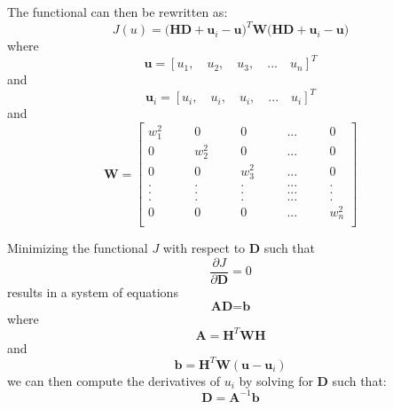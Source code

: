\documentclass[12pt]{extarticle}
\begin{document}
The functional can then be rewritten as:
\begin{equation}
    J(u) = \Big(\textbf{H} \textbf{D} + \textbf{u}_{i} - \textbf{u} \Big)^{T} \textbf{W} \Big(\textbf{H} \textbf{D} + \textbf{u}_{i} - \textbf{u} \Big)
\end{equation}
where
\begin{equation}
    \textbf{u} = \left[ u_{1}, \quad u_{2}, \quad u_{3}, \quad ... \quad u_{n} \right]^{T}
\end{equation}
and
\begin{equation}
    \textbf{u}_{i} = \left[ u_{i}, \quad u_{i}, \quad u_{i}, \quad ... \quad u_{i} \right]^{T}
\end{equation}
and
\begin{equation*}
\textbf{W}= 
  \begin{bmatrix}
      w_{1}^{2} & \quad  & 0 & \quad  & 0 & \quad & ... & \quad & 0 \\
      0 & \quad  & w_{2}^{2} & \quad  & 0 & \quad & ... & \quad & 0 \\
      0 & \quad  & 0 & \quad  & w_{3}^{2} & \quad & ... & \quad & 0 \\
    . & \quad  & . & \quad  & . & \quad & ... & \quad & . \\
    . & \quad  & . & \quad  & . & \quad & ... & \quad & . \\
    . & \quad  & . & \quad  & . & \quad & ... & \quad & . \\
      0 & \quad  & 0 & \quad  & 0 & \quad & ... & \quad & w_{n}^{2} \\
  \end{bmatrix}
\end{equation*}

Minimizing the functional $J$ with respect to $\textbf{D}$ such that 
\begin{equation}
    \frac{\partial J}{\partial \textbf{D}} = 0
\end{equation}
results in a system of equations
\begin{equation}
    \textbf{A} \textbf{D} = \textbf{b}
\end{equation}
where
\begin{equation}
    \textbf{A} = \textbf{H}^{T} \textbf{W} \textbf{H}
\end{equation}
and 
\begin{equation}
    \textbf{b} =  \textbf{H}^{T} \textbf{W} (\textbf{u} - \textbf{u}_{i})
\end{equation}
we can then compute the derivatives of $u_{i}$ by solving for $\textbf{D}$ such that:
\begin{equation}
    \textbf{D} = \textbf{A}^{-1} \textbf{b}
\end{equation}
\end{document}
